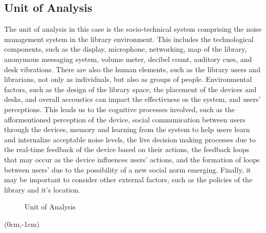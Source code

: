 \subsection{Unit of Analysis}
The unit of analysis in this case is the socio-technical system comprising the noise management system in the library environment. This includes the technological components, such as the display, microphone, networking, map of the library, anonymous messaging system, volume meter, decibel count, auditory cues, and desk vibrations. There are also the human elements, such as the library users and librarians, not only as individuals, but also as groups of people. Environmental factors, such as the design of the library space, the placement of the devices and desks, and overall accoustics can impact the effectivness os the system, and users' perceptions. This leads us to the cognitive processes involved, such as the afformentioned perception of the device, social communication between users through the devices, memory and learning from the system to help users learn and internalize acceptable noise levels, the live decision making processes due to the real-time feedback of the device based on their actions, the feedback loops that may occur as the device influences users' actions, and the formation of loops between users' due to the possibility of a new social norm emerging. Finally, it may be important to consider other external factors, such as the policies of the library and it's location.
\begin{figure}[h]
    \centering
    \caption{Unit of Analysis}
\end{figure}

\restoregeometry



\begin{textblock*}{3cm}(0cm,-1cm) %
\end{textblock*}

